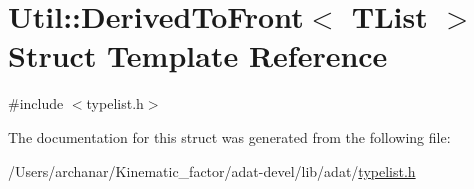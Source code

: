 \hypertarget{structUtil_1_1TL_1_1DerivedToFront}{}\section{Util\+:\+:Derived\+To\+Front$<$ T\+List $>$ Struct Template Reference}
\label{structUtil_1_1TL_1_1DerivedToFront}


{\ttfamily \#include $<$typelist.\+h$>$}



The documentation for this struct was generated from the following file\+:\begin{DoxyCompactItemize}
\item 
/\+Users/archanar/\+Kinematic\+\_\+factor/adat-\/devel/lib/adat/\mbox{\hyperlink{adat-devel_2lib_2adat_2typelist_8h}{typelist.\+h}}\end{DoxyCompactItemize}
